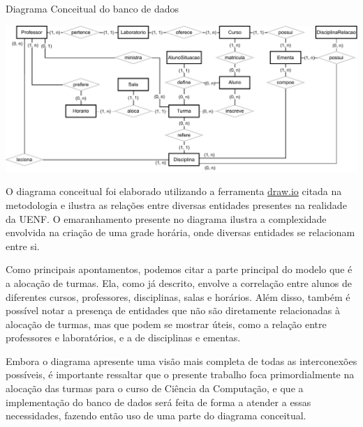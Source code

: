 \begin{MyCenteredFigure}
  \caption{Diagrama Conceitual do banco de dados}
  \label{fig:DiagramConceitual}
  \includegraphics[width=\textwidth]{files/img/DiagramaConceitual/Diagrama ER-Conc. Card.drawio}
\end{MyCenteredFigure} %

O diagrama conceitual foi elaborado utilizando a ferramenta \href{https://www.drawio.com/}{draw.io} citada na metodologia e ilustra as relações entre diversas entidades presentes na realidade da UENF. O emaranhamento presente no diagrama ilustra a complexidade envolvida na criação de uma grade horária, onde diversas entidades se relacionam entre si.

Como principais apontamentos, podemos citar a parte principal do modelo que é a alocação de turmas. Ela, como já descrito, envolve a correlação entre alunos de diferentes cursos, professores, disciplinas, salas e horários. Além disso, também é possível notar a presença de entidades que não são diretamente relacionadas à alocação de turmas, mas que podem se mostrar úteis, como a relação entre professores e laboratórios, e a de disciplinas e ementas.

Embora o diagrama apresente uma visão mais completa de todas as interconexões possíveis, é importante ressaltar que o presente trabalho foca primordialmente na alocação das turmas para o curso de Ciência da Computação, e que a implementação do banco de dados será feita de forma a atender a essas necessidades, fazendo então uso de uma parte do diagrama conceitual.



